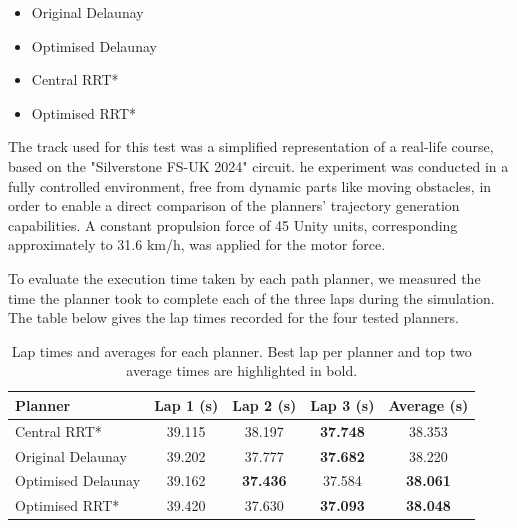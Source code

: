 \documentclass[a4paper,11pt]{report}
\begin{document}
\begin{itemize}
  \item Original Delaunay
  \item Optimised Delaunay
  \item Central RRT*
  \item Optimised RRT*
\end{itemize}

The track used for this test was a simplified representation of a real-life course, based on the "Silverstone FS-UK 2024" circuit. 
he experiment was conducted in a fully controlled environment, free from dynamic parts like moving obstacles, 
in order to enable a direct comparison of the planners’ trajectory generation capabilities. 
A constant propulsion force of 45 Unity units, corresponding approximately to 31.6 km/h, was applied
for the motor force.

To evaluate the execution time taken by each path planner, we measured the time the planner took to complete 
each of the three laps during the simulation. The table below gives the lap times recorded for the four tested planners.

\begin{table}[H]
    \centering
    \begin{tabular}{lccc|c}
    \toprule
    \textbf{Planner} & \textbf{Lap 1 (s)} & \textbf{Lap 2 (s)} & \textbf{Lap 3 (s)} & \textbf{Average (s)} \\
    \midrule
    Central RRT* & 39.115 & 38.197 & \textbf{37.748} & 38.353 \\
    Original Delaunay & 39.202 & 37.777 & \textbf{37.682} & 38.220 \\
    Optimised Delaunay & 39.162 & \textbf{37.436} & 37.584 & \textbf{38.061} \\
    Optimised RRT* & 39.420 & 37.630 & \textbf{37.093} & \textbf{38.048} \\
    \bottomrule
    \end{tabular}
    \caption{Lap times and averages for each planner. Best lap per planner and top two average times are highlighted in bold.}
    \label{tab:lap-times}
    \end{table}
    
\end{document}
